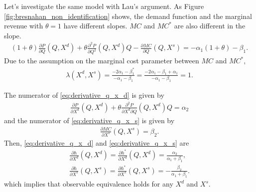 \documentclass[11pt, a4paper]{article}
\theoremstyle{remark}
\begin{document}
Let's investigate the same model with Lau's argument.
As Figure \ref{fig:bresnahan_non_identification} shows, the demand function and the marginal revenue with $\theta = 1$ have different slopes.
$MC$ and $MC^{*}$ are also different in the slope.
\begin{align}
    (1+\theta) \frac{\partial P}{\partial Q}(Q, X^d) + \theta \frac{\partial^2 P}{\partial Q^2}(Q, X^d) Q  - \frac{\partial MC}{\partial Q}(Q, X^s) = -\alpha_1(1 + \theta)   - \beta_1.
\end{align}
Due to the assumption on the marginal cost parameter between $MC$ and $MC^{*}$,
\begin{align}
    \lambda(X^{d}, X^{s}) = \frac{-2\alpha_1  - \beta_1^{*}}{-\alpha_1  - \beta_1} =   \frac{-2\alpha_1  -\beta_1 + \alpha_1}{-\alpha_1  - \beta_1} = 1.
\end{align}

The numerator of \eqref{eq:derivative_q_x_d} is given by
\begin{align}
    \frac{\partial P}{\partial X^{d}}(Q, X^{d}) + \theta\frac{\partial^2 P}{\partial X^{d}\partial Q}(Q, X^{d})Q   = \alpha_2
\end{align}
and the numerator of \eqref{eq:derivative_q_x_s} is given by
\begin{align}
    \frac{\partial MC}{\partial X^{s}}(Q, X^{s}) = \beta_2.
\end{align}
Then, \eqref{eq:derivative_q_x_d} and \eqref{eq:derivative_q_x_s} are 
\begin{align}
    \frac{\partial h}{\partial X^{d}}(Q, X^{d}) = \frac{\partial h^{*}}{\partial X^{d}}(Q, X^{d})  = \frac{\alpha_2}{\alpha_1 + \beta_1},\\
    \frac{\partial h}{\partial X^{s}}(Q, X^{s}) = \frac{\partial h^{*}}{\partial X^{s}}(Q, X^{s})  =-\frac{\beta_2}{\alpha_1 + \beta_1}.
\end{align}
which implies that observable equivalence holds for any $X^d$ and $X^s$.
\end{document}
